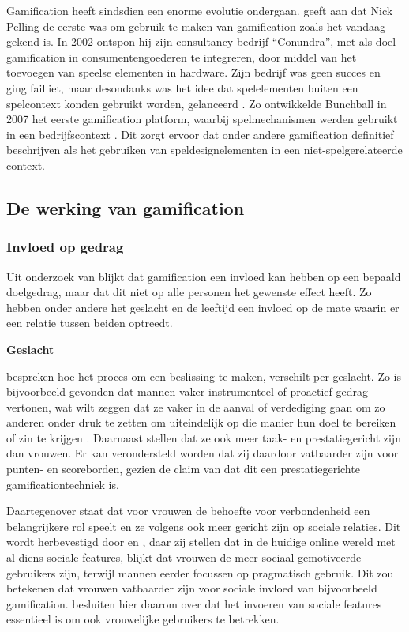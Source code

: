 Gamification heeft sindsdien een enorme evolutie ondergaan. \textcite{Dreimane2021} geeft aan dat Nick Pelling de eerste was om gebruik te maken van gamification zoals het vandaag gekend is. In 2002 ontspon hij zijn consultancy bedrijf “Conundra”, met als doel gamification in consumentengoederen te integreren, door middel van het toevoegen van speelse elementen in hardware. Zijn bedrijf was geen succes en ging failliet, maar desondanks was het idee dat spelelementen buiten een spelcontext konden gebruikt worden, gelanceerd \autocite{Khaitova2021}. Zo ontwikkelde Bunchball in 2007 het eerste gamification platform, waarbij spelmechanismen werden gebruikt in een bedrijfscontext \autocite{Khaitova2021}. Dit zorgt ervoor dat onder andere \textcite{Deterding2011} gamification definitief beschrijven als het gebruiken van speldesignelementen in een niet-spelgerelateerde context.

\subsection{De werking van gamification}
\label{ssec:werking-gamification}

\subsubsection{Invloed op gedrag}
Uit onderzoek van \textcite{Hamari2013a} blijkt dat gamification een invloed kan hebben op een bepaald doelgedrag, maar dat dit niet op alle personen het gewenste effect heeft. Zo hebben onder andere het geslacht en de leeftijd een invloed op de mate waarin er een relatie tussen beiden optreedt.

\textbf{Geslacht}

\textcite{Venkatesh2000} bespreken hoe het proces om een beslissing te maken, verschilt per geslacht. Zo is bijvoorbeeld gevonden dat mannen vaker instrumenteel of proactief gedrag vertonen, wat wilt zeggen dat ze vaker in de aanval of verdediging gaan om zo anderen onder druk te zetten om uiteindelijk op die manier hun doel te bereiken of zin te krijgen \autocite{Spence1980}. Daarnaast stellen \textcite{Hoffman1972, Minton1980} dat ze ook meer taak- en prestatiegericht zijn dan vrouwen.
Er kan verondersteld worden dat zij daardoor vatbaarder zijn voor punten- en scoreborden, gezien de claim van \textcite{Hamari2014} dat dit een prestatiegerichte gamificationtechniek is.

Daartegenover staat dat voor vrouwen de behoefte voor verbondenheid een belangrijkere rol speelt \autocite{Hoffman1972} en ze volgens \textcite{Minton1980, Spence1980} ook meer gericht zijn op sociale relaties. Dit wordt herbevestigd door \textcite{Haferkamp2012} en \textcite{Muscanell2012}, daar zij stellen dat in de huidige online wereld met al diens sociale features, blijkt dat vrouwen de meer sociaal gemotiveerde gebruikers zijn, terwijl mannen eerder focussen op pragmatisch gebruik. Dit zou betekenen dat vrouwen vatbaarder zijn voor sociale invloed van bijvoorbeeld gamification. \textcite{Koivisto2014} besluiten hier daarom over dat het invoeren van sociale features essentieel is om ook vrouwelijke gebruikers te betrekken.

